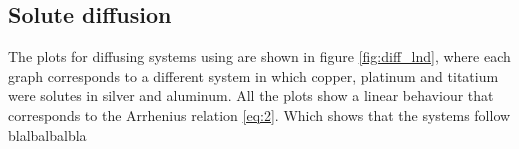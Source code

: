 \subsection{Solute diffusion}

The plots for diffusing systems using are shown in figure \ref{fig:diff_lnd}, where each graph corresponds to a different system in which copper, platinum and titatium were solutes in silver and aluminum. All the plots show a linear behaviour that corresponds to the Arrhenius relation \ref{eq:2}. Which shows that the systems follow blalbalbalbla

\begin{figure}[H]
 \centering
 \captionsetup{justification=centering}
   \\

\end{figure}
